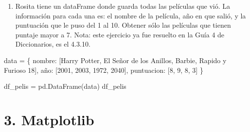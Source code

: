 \documentclass[
  letterpaper,
  DIV=11,
  numbers=noendperiod]{scrreprt}
\newenvironment{Shaded}{\begin{snugshade}}{\end{snugshade}}
\newcommand{\NormalTok}[1]{\textcolor[rgb]{0.00,0.23,0.31}{#1}}
\providecommand{\tightlist}{%
  \setlength{\itemsep}{0pt}\setlength{\parskip}{0pt}}\usepackage{longtable,booktabs,array}
\begin{document}
\begin{enumerate}
\def\labelenumi{\arabic{enumi}.}
\setcounter{enumi}{24}
\tightlist
\item
  Rosita tiene un dataFrame donde guarda todas las películas que vió. La
  información para cada una es: el nombre de la película, año en que
  salió, y la puntuación que le puso del 1 al 10. Obtener sólo las
  películas que tienen puntaje mayor a 7. Nota: este ejercicio ya fue
  resuelto en la Guía 4 de Diccionarios, es el 4.3.10.
\end{enumerate}

\begin{Shaded}
\begin{Highlighting}[]
\NormalTok{data = \{}
\NormalTok{    \textquotesingle{}nombre\textquotesingle{}: [\textquotesingle{}Harry Potter\textquotesingle{}, \textquotesingle{}El Señor de los Anillos\textquotesingle{}, \textquotesingle{}Barbie\textquotesingle{}, \textquotesingle{}Rapido y Furioso 18\textquotesingle{}],}
\NormalTok{    \textquotesingle{}año\textquotesingle{}: [2001, 2003, 1972, 2040],}
\NormalTok{    \textquotesingle{}puntuacion\textquotesingle{}: [8, 9, 8, 3]}
\NormalTok{\}}

\NormalTok{df\_pelis = pd.DataFrame(data)}
\NormalTok{df\_pelis}
\end{Highlighting}
\end{Shaded}

\section*{3. Matplotlib}\label{matplotlib-1}

\end{document}
